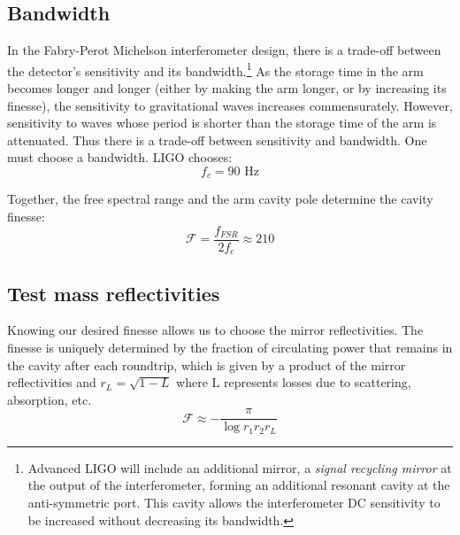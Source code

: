 \subsection*{Bandwidth}

In the Fabry-Perot Michelson interferometer design, there is a trade-off
between the detector's sensitivity and its bandwidth.\footnote{Advanced LIGO will include an additional mirror, a \emph{signal recycling mirror} at the output of the interferometer, forming an additional resonant cavity at the anti-symmetric port.  This cavity allows the interferometer DC sensitivity to be increased without decreasing its bandwidth.}  As the storage
time in the arm becomes longer and longer (either by making the arm
longer, or by increasing its finesse), the sensitivity to gravitational
waves increases commensurately. However, sensitivity to waves whose
period is shorter than the storage time of the arm is attenuated.
Thus there is a trade-off between sensitivity and bandwidth. 
One must choose a bandwidth. LIGO chooses:
%
\begin{equation}
f_{c}=90\text{\ Hz}
\end{equation}

Together, the free spectral range and the arm cavity pole determine
the cavity finesse:
\begin{equation}
\mathcal{F}=\frac{f_{FSR}}{2f_{c}}\approx210
\end{equation}

\subsection*{Test mass reflectivities}

Knowing our desired finesse allows us to choose the mirror reflectivities.
The finesse is uniquely determined by the fraction of circulating
power that remains in the cavity after each roundtrip, which is given
by a product of the mirror reflectivities and $r_{L}=\sqrt{1-L}$
where L represents losses due to scattering, absorption, etc. 
\begin{equation}
\mathcal{F}\approx-\frac{\pi}{\log r_{1}r_{2}r_{L}}
\end{equation}

